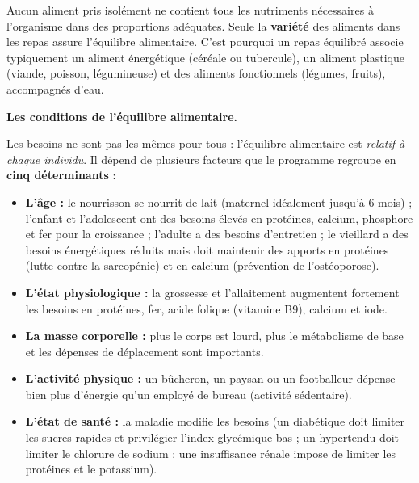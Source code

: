 \documentclass[11pt]{article}
\begin{document}
\begin{propriete}
Aucun aliment pris isolément ne contient tous les nutriments nécessaires à l'organisme dans des proportions adéquates. Seule la \textbf{variété} des aliments dans les repas assure l'équilibre alimentaire. C'est pourquoi un repas équilibré associe typiquement un aliment énergétique (céréale ou tubercule), un aliment plastique (viande, poisson, légumineuse) et des aliments fonctionnels (légumes, fruits), accompagnés d'eau.
\end{propriete}

\textbf{Les conditions de l'équilibre alimentaire.}\par

Les besoins ne sont pas les mêmes pour tous : l'équilibre alimentaire est \emph{relatif à chaque individu}. Il dépend de plusieurs facteurs que le programme regroupe en \textbf{cinq déterminants} :

\begin{itemize}
  \item \textbf{L'âge :} le nourrisson se nourrit de lait (maternel idéalement jusqu'à 6 mois) ; l'enfant et l'adolescent ont des besoins élevés en protéines, calcium, phosphore et fer pour la croissance ; l'adulte a des besoins d'entretien ; le vieillard a des besoins énergétiques réduits mais doit maintenir des apports en protéines (lutte contre la sarcopénie) et en calcium (prévention de l'ostéoporose).
  \item \textbf{L'état physiologique :} la grossesse et l'allaitement augmentent fortement les besoins en protéines, fer, acide folique (vitamine B9), calcium et iode.
  \item \textbf{La masse corporelle :} plus le corps est lourd, plus le métabolisme de base et les dépenses de déplacement sont importants.
  \item \textbf{L'activité physique :} un bûcheron, un paysan ou un footballeur dépense bien plus d'énergie qu'un employé de bureau (activité sédentaire).
  \item \textbf{L'état de santé :} la maladie modifie les besoins (un diabétique doit limiter les sucres rapides et privilégier l'index glycémique bas ; un hypertendu doit limiter le chlorure de sodium ; une insuffisance rénale impose de limiter les protéines et le potassium).
\end{itemize}
\end{document}
